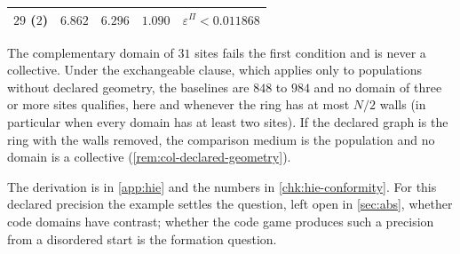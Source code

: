 \begin{example}
\begin{center}
\begin{tabular}{@{}lllll@{}}
$29$ ($2$) & $6.862$ & $6.296$ & $1.090$ & $\varepsilon^\Pi<0.011868$\\
\bottomrule
\end{tabular}
\end{center}
The complementary domain of $31$ sites fails the first condition and is never a collective. Under the exchangeable clause, which applies only to populations without declared geometry, the baselines are $848$ to $984$ and no domain of three or more sites qualifies, here and whenever the ring has at most $N/2$ walls (in particular when every domain has at least two sites). If the declared graph is the ring with the walls removed, the comparison medium is the population and no domain is a collective (\cref{rem:col-declared-geometry}).
\end{example}

The derivation is in \cref{app:hie} and the numbers in \cref{chk:hie-conformity}. For this declared precision the example settles the question, left open in \cref{sec:abs}, whether code domains have contrast; whether the code game produces such a precision from a disordered start is the formation question.

